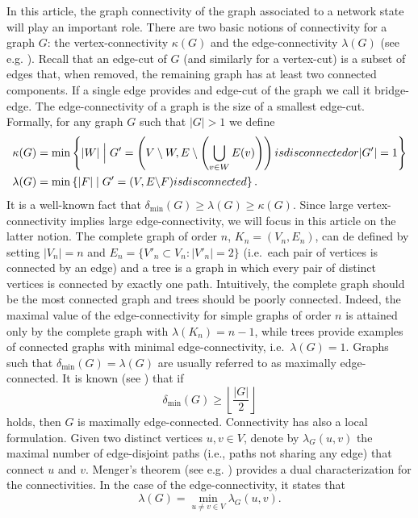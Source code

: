 \documentclass[a4paper,onecolumn,accepted=2024-12-14]{quantumarticle}
\theoremstyle{plain}
\begin{document}
In this article, the graph connectivity of the graph associated to a network state will play an important role. There are two basic notions of connectivity for a graph $G$:
the vertex-connectivity $\kappa(G)$ and the edge-connectivity $\lambda(G)$
(see e.g. \cite{diestel,bondy}).
Recall that an edge-cut of $G$ (and similarly for a vertex-cut) is a subset of edges that, when removed, the remaining graph has at least two connected components. If a single edge provides and edge-cut of the graph we call it
bridge-edge. The edge-connectivity of a
graph is the size of a smallest edge-cut. Formally, for any graph $G$ such that $|G|>1$ we define
\begin{align}
\kappa(G) &=\min\left\{|W| \Bigm\vert  G'=\left(V\setminus W,E \setminus
\left(\bigcup_{v\in W}E(v)\right)\right)\textrm{ is disconnected or } |G'|=1
\right\}
\\
\lambda(G) &=\min\left\{|F| \mid G'=(V,E\backslash F)\textrm{ is disconnected}\right \}.
\end{align}
It is a well-known fact that $\delta_{\mathrm{min}}(G)\geq\lambda(G)\geq\kappa(G)$. Since large vertex-connectivity implies large
edge-connectivity, we will focus in this article on the latter notion. The complete graph of order $n$, $K_n=(V_n,E_n)$, can de defined by setting $|V_n|=n$ and $E_n=\{V'_n\subset V_n:|V'_n|=2\}$ (i.e.\ each pair of vertices is connected by an edge) and a tree is a graph in which every pair of distinct vertices is connected by exactly one path. Intuitively, the complete graph should be the most connected graph and trees should be poorly connected. Indeed, the maximal value of the edge-connectivity for simple graphs of order $n$ is attained only by the complete graph with $\lambda(K_n)=n-1$, while trees provide examples of connected graphs with minimal edge-connectivity, i.e.\ $\lambda(G)=1$. Graphs such that $\delta_{\mathrm{min}}(G)=\lambda(G)$ are usually referred to as
maximally edge-connected. It is known
(see \cite{chartrand}) that if
\begin{equation}\label{maxedgeconnected}
\delta_{\mathrm{min}}(G)\geq\left\lfloor\frac{|G|}{2}\right\rfloor
\end{equation}
holds, then $G$ is maximally edge-connected. Connectivity has also a local formulation.
Given two distinct vertices $u,v\in V$, denote by $\lambda_G(u,v)$ the maximal number of edge-disjoint paths (i.e., paths not sharing any edge) that connect $u$ and $v$. Menger's theorem (see e.g. \cite[Theorem~3.3.1]{diestel}) provides a dual characterization for the connectivities. In the case of the edge-connectivity, it states that
 \begin{equation}\label{menger}
 \lambda(G)=\min_{u\not= v\in V}\lambda_G(u,v).
 \end{equation}
\end{document}
